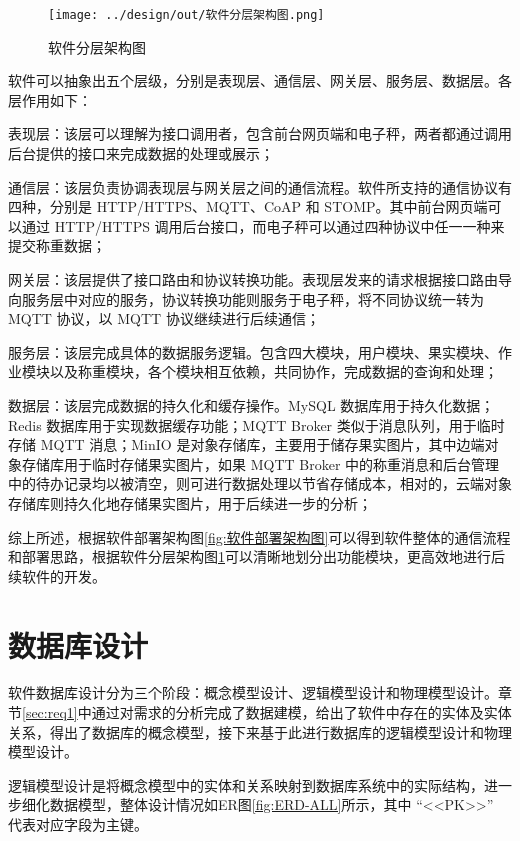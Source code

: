 \begin{figure}
    \centering
    \texttt{[image: ../design/out/软件分层架构图.png]}
    \caption{软件分层架构图}
    \label{fig:软件分层架构图}
\end{figure}

软件可以抽象出五个层级，分别是表现层、通信层、网关层、服务层、数据层。各层作用如下：

表现层：该层可以理解为接口调用者，包含前台网页端和电子秤，两者都通过调用后台提供的接口来完成数据的处理或展示；

通信层：该层负责协调表现层与网关层之间的通信流程。软件所支持的通信协议有四种，分别是 HTTP/HTTPS、MQTT、CoAP 和 STOMP。其中前台网页端可以通过 HTTP/HTTPS 调用后台接口，而电子秤可以通过四种协议中任一一种来提交称重数据；

网关层：该层提供了接口路由和协议转换功能。表现层发来的请求根据接口路由导向服务层中对应的服务，协议转换功能则服务于电子秤，将不同协议统一转为 MQTT 协议，以 MQTT 协议继续进行后续通信；

服务层：该层完成具体的数据服务逻辑。包含四大模块，用户模块、果实模块、作业模块以及称重模块，各个模块相互依赖，共同协作，完成数据的查询和处理；

数据层：该层完成数据的持久化和缓存操作。MySQL 数据库用于持久化数据；Redis 数据库用于实现数据缓存功能；MQTT Broker 类似于消息队列，用于临时存储 MQTT 消息；MinIO 是对象存储库，主要用于储存果实图片，其中边端对象存储库用于临时存储果实图片，如果 MQTT Broker 中的称重消息和后台管理中的待办记录均以被清空，则可进行数据处理以节省存储成本，相对的，云端对象存储库则持久化地存储果实图片，用于后续进一步的分析；

综上所述，根据软件部署架构图\ref{fig:软件部署架构图}可以得到软件整体的通信流程和部署思路，根据软件分层架构图\ref{fig:软件分层架构图}可以清晰地划分出功能模块，更高效地进行后续软件的开发。

\section{数据库设计}\label{sec:database}

软件数据库设计分为三个阶段：概念模型设计、逻辑模型设计和物理模型设计\cite{苗雪兰2001数据库系统原理及应用教程}。章节\ref{sec:req1}中通过对需求的分析完成了数据建模，给出了软件中存在的实体及实体关系，得出了数据库的概念模型，接下来基于此进行数据库的逻辑模型设计和物理模型设计。

逻辑模型设计是将概念模型中的实体和关系映射到数据库系统中的实际结构\cite{苗雪兰2001数据库系统原理及应用教程}，进一步细化数据模型，整体设计情况如ER图\ref{fig:ERD-ALL}所示，其中 “<<PK>>” 代表对应字段为主键。

